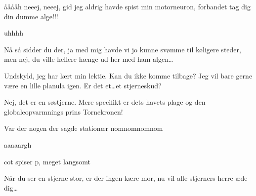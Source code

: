 \documentclass[a4paper,11pt]{article}
\begin{document}
\begin{sketch}
 ååååh neeej, neeej, gid jeg aldrig havde spist min motorneuron, forbandet tag dig din dumme alge!!!


 uhhhh

 Nå så sidder du der, ja med mig havde vi jo kunne svømme til køligere steder, men nej, du ville hellere hænge ud her med ham algen\ldots

 Undskyld, jeg har lært min lektie. Kan du ikke komme tilbage? Jeg vil bare gerne være en lille planula igen. Er det et\ldots et stjerneskud? 


 Nej, det er en søstjerne. Mere specifikt er dets havets plage og den globaleopvarmnings prins Tornekronen!


 Var der nogen der sagde stationær nomnomnomnom

 aaaaargh

\scene cot spiser p, meget langsomt

 Når du ser en stjerne stor, er der ingen kære mor, nu vil alle stjerners herre æde dig\ldots


\end{sketch}
\end{document}
